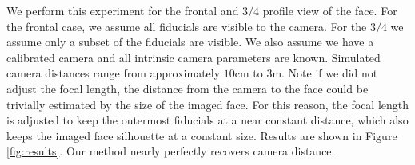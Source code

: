 \documentclass[runningheads]{llncs}
\begin{document}
We perform this experiment for the frontal and $3/4$ profile view of the face.  
For the frontal case, we assume all fiducials are visible to the camera.  
For the $3/4$ we assume only a subset of the fiducials are visible. 
We also assume we have a calibrated camera and all intrinsic camera parameters are known.  
Simulated camera distances range from approximately $10$cm to $3$m.
Note if we did not adjust the focal length, the distance from the camera to the face could be trivially estimated by the size of the imaged face. 
For this reason, the focal length is adjusted to keep the outermost fiducials at a near constant distance, which also keeps the imaged face silhouette at a constant size.
Results are shown in Figure \ref{fig:results}.
Our method nearly perfectly recovers camera distance.

\end{document}
